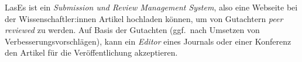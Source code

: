 
LasEs ist ein \emph{Submission und Review Management System}, also eine Webseite bei der Wissenschaftler:innen Artikel hochladen können, um von Gutachtern \emph{peer reviewed} zu werden.
Auf Basis der Gutachten (ggf.\ nach Umsetzen von Verbesserungsvorschlägen), kann ein \emph{Editor} eines Journals oder einer Konferenz den Artikel für die Veröffentlichung akzeptieren.
